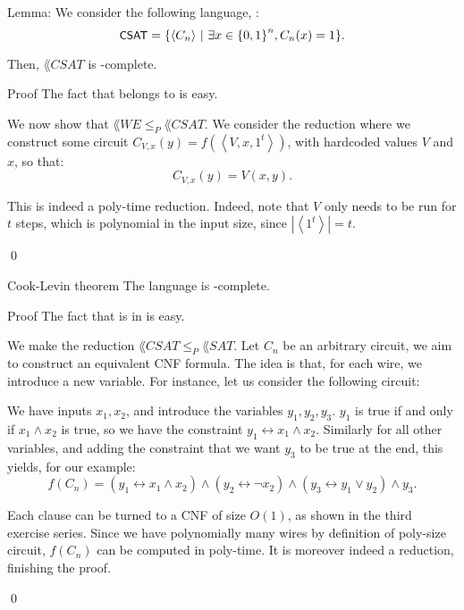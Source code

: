 \documentclass[a4paper]{article}
\begin{document}
\begin{parag}{Lemma: }
    We consider the following language, : 
    \[\lang{CSAT} = \left\{\left\langle C_n \right\rangle \suchthat \exists x \in \left\{0, 1\right\}^n, C_n\left(x\right) = 1\right\}.\]

    Then, $\lang{CSAT}$ is -complete.

    \begin{subparag}{Proof}
        The fact that  belongs to  is easy.

        We now show that $\lang{WE} \leq_P \lang{CSAT}$. We consider the reduction where we construct some circuit $C_{V, x}\left(y\right) = f\left(\left\langle V, x, 1^t \right\rangle\right)$, with hardcoded values $V$ and $x$, so that: 
        \[C_{V, x}\left(y\right) = V\left(x, y\right).\]

        This is indeed a poly-time reduction. Indeed, note that $V$ only needs to be run for $t$ steps, which is polynomial in the input size, since $\left|\left\langle 1^t \right\rangle\right| = t$.

        \qed
    \end{subparag}
\end{parag}

\begin{parag}{Cook-Levin theorem}
    The language  is -complete.

    \begin{subparag}{Proof}
        The fact that  is in  is easy. 

        We make the reduction $\lang{CSAT} \leq_P \lang{SAT}$. Let $C_n$ be an arbitrary circuit, we aim to construct an equivalent CNF formula. The idea is that, for each wire, we introduce a new variable. For instance, let us consider the following circuit:

        We have inputs $x_1, x_2$, and introduce the variables $y_1, y_2, y_3$. $y_1$ is true if and only if $x_1 \land x_2$ is true, so we have the constraint $y_1 \leftrightarrow x_1 \land x_2$. Similarly for all other variables, and adding the constraint that we want $y_3$ to be true at the end, this yields, for our example: 
        \[f\left(C_n\right) = \left(y_1 \leftrightarrow x_1 \land x_2\right) \land \left(y_2 \leftrightarrow \lnot x_2\right) \land \left(y_3 \leftrightarrow y_1 \lor y_2\right) \land y_3.\]

        Each clause can be turned to a CNF of size $O\left(1\right)$, as shown in the third exercise series. Since we have polynomially many wires by definition of poly-size circuit, $f\left(C_n\right)$ can be computed in poly-time. It is moreover indeed a reduction, finishing the proof.

        \qed
    \end{subparag}
\end{parag}
\end{document}
